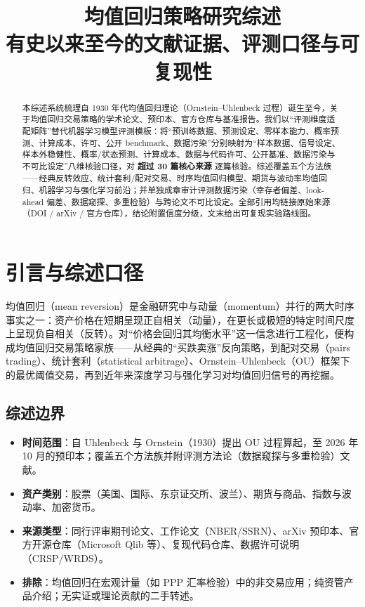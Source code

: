 \documentclass[11pt,a4paper]{ctexart}
\title{\bfseries 均值回归策略研究综述\\\large 有史以来至今的文献证据、评测口径与可复现性}
\author{}
\date{}
\begin{document}
\maketitle

\begin{abstract}
\noindent 本综述系统梳理自 1930 年代均值回归理论（Ornstein--Uhlenbeck 过程）诞生至今，关于均值回归交易策略的学术论文、预印本、官方仓库与基准报告。我们以“评测维度适配矩阵”替代机器学习模型评测模板：将“预训练数据、预测设定、零样本能力、概率预测、计算成本、许可、公开 benchmark、数据污染”分别映射为“样本数据、信号设定、样本外稳健性、概率/状态预测、计算成本、数据与代码许可、公开基准、数据污染与不可比设定”八维核验口径，对 \textbf{超过 30 篇核心来源} 逐篇核验。综述覆盖五个方法族——经典反转效应、统计套利/配对交易、时序均值回归模型、期货与波动率均值回归、机器学习与强化学习前沿；并单独成章审计评测数据污染（幸存者偏差、look-ahead 偏差、数据窥探、多重检验）与跨论文不可比设定。全部引用均链接原始来源（DOI / arXiv / 官方仓库），结论附置信度分级，文末给出可复现实验路线图。
\end{abstract}

\tableofcontents

\section{引言与综述口径}\label{sec:intro}

均值回归（mean reversion）是金融研究中与动量（momentum）并行的两大时序事实之一：资产价格在短期呈现正自相关（动量），在更长或极短的特定时间尺度上呈现负自相关（反转）。对“价格会回归其均衡水平”这一信念进行工程化，便构成均值回归交易策略家族——从经典的“买跌卖涨”反向策略，到配对交易（pairs trading）、统计套利（statistical arbitrage）、Ornstein--Uhlenbeck（OU）框架下的最优阈值交易，再到近年来深度学习与强化学习对均值回归信号的再挖掘。

\subsection{综述边界}

\begin{itemize}
  \item \textbf{时间范围}：自 Uhlenbeck 与 Ornstein（1930）提出 OU 过程算起，至 2026 年 10 月的预印本；覆盖五个方法族并附评测方法论（数据窥探与多重检验）文献。
  \item \textbf{资产类别}：股票（美国、国际、东京证交所、波兰）、期货与商品、指数与波动率、加密货币。
  \item \textbf{来源类型}：同行评审期刊论文、工作论文（NBER/SSRN）、arXiv 预印本、官方开源仓库（Microsoft Qlib 等）、复现代码仓库、数据许可说明（CRSP/WRDS）。
  \item \textbf{排除}：均值回归在宏观计量（如 PPP 汇率检验）中的非交易应用；纯资管产品介绍；无实证或理论贡献的二手转述。
\end{itemize}
\end{document}
